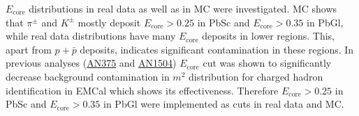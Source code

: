 $E_{\text{core}}$ distributions in real data as well as in MC were investigated. MC shows that $\pi^\pm$ and $K^\pm$ mostly deposit $E_{\text{core}} > 0.25$ in PbSc and $E_{\text{core}} > 0.35$ in PbGl, while real data distributions have many $E_{\text{core}}$ deposits in lower regions. 
This, apart from $p+\bar{p}$ deposits, indicates significant contamination in these regions. 
In previous analyses (\href{https://phenix-intra.sdcc.bnl.gov/phenix/WWW/p/info/an/375/}{AN375} and \href{https://phenix-intra.sdcc.bnl.gov/phenix/WWW/p/draft/berd/Sergei/AN_AuAu_KStar.pdf}{AN1504}) $E_{\text{core}}$ cut was shown to significantly decrease background contamination in $m^2$ distribution for charged hadron identification in EMCal which shows its effectiveness.
Therefore $E_{\text{core}} > 0.25$ in PbSc and $E_{\text{core}} > 0.35$ in PbGl were implemented as cuts in real data and MC.
